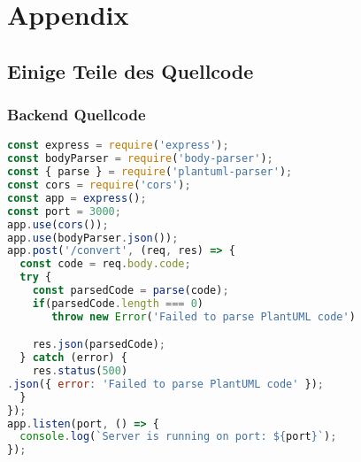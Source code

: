 
\chapter{Appendix}
\section{Einige Teile des Quellcode}
\subsection{Backend Quellcode}

\begin{lstlisting}[caption={Node/Express Backend Quelltext}, label={lst:bakcend}, language=javascript]
const express = require('express');
const bodyParser = require('body-parser');
const { parse } = require('plantuml-parser');
const cors = require('cors');
const app = express();
const port = 3000;
app.use(cors());
app.use(bodyParser.json());
app.post('/convert', (req, res) => {
  const code = req.body.code;
  try {
    const parsedCode = parse(code);
    if(parsedCode.length === 0)
       throw new Error('Failed to parse PlantUML code')

    res.json(parsedCode);
  } catch (error) {
    res.status(500)
.json({ error: 'Failed to parse PlantUML code' });
  }
});
app.listen(port, () => {
  console.log(`Server is running on port: ${port}`);
});
\end{lstlisting}